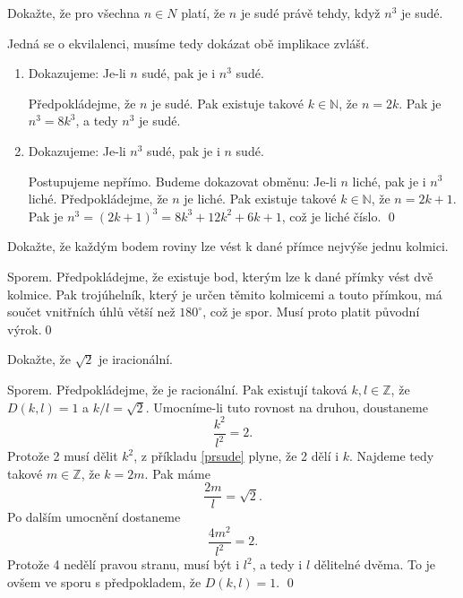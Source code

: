 \begin{priklad}
Dokažte, že pro všechna $n\in N$ platí, že $n$ je sudé právě tehdy, když $n^3$ je sudé.
\end{priklad}

\begin{reseni}
Jedná se o ekvilalenci, musíme tedy dokázat obě implikace zvlášť.
\begin{enumerate}
	\item[$\implies$] Dokazujeme: Je-li $n$ sudé, pak je i $n^3$ sudé.
	\par Předpokládejme, že $n$ je sudé. Pak existuje takové $k \in \mathbb N $, že
	$n=2k$. Pak je $n^3 = 8k^3$, a tedy $n^3$ je sudé.
	\item[$\impliedby$] Dokazujeme: Je-li $n^3$ sudé, pak je i $n$ sudé.
	\par Postupujeme nepřímo. Budeme dokazovat obměnu: Je-li $n$ liché, pak je i $n^3$ liché.
	Předpokládejme, že $n$ je liché. Pak existuje takové $k \in \mathbb N $, že
	$n=2k+1$. Pak je $n^3 = (2k+1)^3 = 8k^3+ 12 k ^2 + 6k + 1$, což je liché číslo. \qed
\end{enumerate}
\end{reseni}

\begin{priklad}
Dokažte, že každým bodem roviny lze vést k dané přímce nejvýše jednu kolmici.
\end{priklad}

\begin{reseni}
Sporem. Předpokládejme, že existuje bod, kterým lze k dané přímky vést dvě kolmice. Pak trojúhelník,
který je určen těmito kolmicemi a touto přímkou, má součet vnitřních úhlů větší než $180^\circ$,
což je spor. Musí proto platit původní výrok.\qed
\end{reseni}

\begin{priklad}
Dokažte, že $\sqrt{2} $ je iracionální.
\end{priklad}

\begin{reseni}
Sporem. Předpokládejme, že je racionální. Pak existují taková $k,l \in \mathbb Z $, že $D(k,l)=1$ a
$k/l = \sqrt{2}$. Umocníme-li tuto rovnost na druhou, doustaneme
$$
\frac{k^2}{l^2} =2.
$$
Protože 2 musí dělit $k^2$, z příkladu \ref{prsude} plyne, že 2 dělí i $k$. Najdeme tedy takové $m \in \mathbb Z $,
že $k = 2m$. Pak máme
$$
\frac{2m}{l} = \sqrt{2}.
$$
Po dalším umocnění dostaneme
$$
\frac{4m^2}{l^2} = 2.
$$
Protože 4 nedělí pravou stranu, musí být i $l^2$, a tedy i $l$ dělitelné dvěma. To je ovšem ve sporu
s předpokladem, že $D(k,l)=1$. \qed
\end{reseni}

